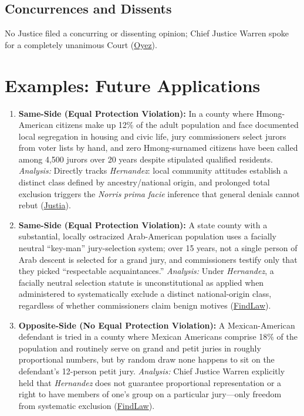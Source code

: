 \documentclass[12pt]{article}
\begin{document}
\subsection{Concurrences and Dissents}
No Justice filed a concurring or dissenting opinion; Chief Justice Warren spoke for a completely unanimous Court (\href{https://www.oyez.org/cases/1940-1955/347us475}{Oyez}).

\section{Examples: Future Applications}
\begin{enumerate}
\item \textbf{Same-Side (Equal Protection Violation):} In a county where Hmong-American citizens make up 12\% of the adult population and face documented local segregation in housing and civic life, jury commissioners select jurors from voter lists by hand, and zero Hmong-surnamed citizens have been called among 4,500 jurors over 20 years despite stipulated qualified residents. \textit{Analysis:} Directly tracks \textit{Hernandez}: local community attitudes establish a distinct class defined by ancestry/national origin, and prolonged total exclusion triggers the \textit{Norris} \textit{prima facie} inference that general denials cannot rebut (\href{https://supreme.justia.com/cases/federal/us/347/475/}{Justia}).
\item \textbf{Same-Side (Equal Protection Violation):} A state county with a substantial, locally ostracized Arab-American population uses a facially neutral ``key-man'' jury-selection system; over 15 years, not a single person of Arab descent is selected for a grand jury, and commissioners testify only that they picked ``respectable acquaintances.'' \textit{Analysis:} Under \textit{Hernandez}, a facially neutral selection statute is unconstitutional as applied when administered to systematically exclude a distinct national-origin class, regardless of whether commissioners claim benign motives (\href{https://caselaw.findlaw.com/court/us-supreme-court/347/475.html}{FindLaw}).
\item \textbf{Opposite-Side (No Equal Protection Violation):} A Mexican-American defendant is tried in a county where Mexican Americans comprise 18\% of the population and routinely serve on grand and petit juries in roughly proportional numbers, but by random draw none happens to sit on the defendant's 12-person petit jury. \textit{Analysis:} Chief Justice Warren explicitly held that \textit{Hernandez} does not guarantee proportional representation or a right to have members of one's group on a particular jury---only freedom from systematic exclusion (\href{https://caselaw.findlaw.com/court/us-supreme-court/347/475.html}{FindLaw}).

\end{enumerate}
\end{document}
